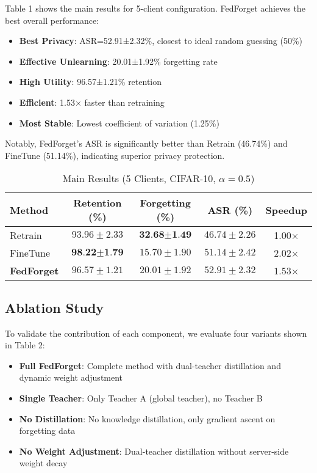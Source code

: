 \documentclass[10pt,twocolumn]{article}
\begin{document}
Table 1 shows the main results for 5-client configuration. FedForget achieves the best overall performance:

\begin{itemize}
\item \textbf{Best Privacy}: ASR=52.91±2.32\%, closest to ideal random guessing (50\%)
\item \textbf{Effective Unlearning}: 20.01±1.92\% forgetting rate
\item \textbf{High Utility}: 96.57±1.21\% retention
\item \textbf{Efficient}: 1.53× faster than retraining
\item \textbf{Most Stable}: Lowest coefficient of variation (1.25\%)
\end{itemize}

Notably, FedForget's ASR is significantly better than Retrain (46.74\%) and FineTune (51.14\%), indicating superior privacy protection.

\begin{table*}[t]
\centering
\caption{Main Results (5 Clients, CIFAR-10, $\alpha=0.5$)}
\label{tab:main_results}
\begin{tabular}{lcccc}
\toprule
Method & Retention (\%) & Forgetting (\%) & ASR (\%) & Speedup \\
\midrule
Retrain & $93.96 \pm 2.33$ & $\textbf{32.68} \pm \textbf{1.49}$ & $46.74 \pm 2.26$ & 1.00× \\
FineTune & $\textbf{98.22} \pm \textbf{1.79}$ & $15.70 \pm 1.90$ & $51.14 \pm 2.42$ & 2.02× \\
\textbf{FedForget} & $\mathbf{96.57} \pm \mathbf{1.21}$ & $20.01 \pm 1.92$ & $\mathbf{52.91} \pm \mathbf{2.32}$ & $\mathbf{1.53}$× \\
\bottomrule
\end{tabular}
\end{table*}

\subsection{Ablation Study}

To validate the contribution of each component, we evaluate four variants shown in Table 2:

\begin{itemize}
\item \textbf{Full FedForget}: Complete method with dual-teacher distillation and dynamic weight adjustment
\item \textbf{Single Teacher}: Only Teacher A (global teacher), no Teacher B
\item \textbf{No Distillation}: No knowledge distillation, only gradient ascent on forgetting data
\item \textbf{No Weight Adjustment}: Dual-teacher distillation without server-side weight decay
\end{itemize}
\end{document}
